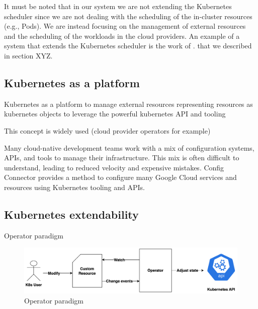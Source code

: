 It must be noted that in our system we are not extending the Kubernetes scheduler since we are not dealing with the scheduling of the in-cluster resources (e.g., Pods). 
We are instead focusing on the management of external resources and the scheduling of the workloads in the cloud providers.
An example of a system that extends the Kubernetes scheduler is the work of . \cite{} that we described in section XYZ.

\subsection{Kubernetes as a platform}

Kubernetes as a platform to manage external resources
representing resources as kubernetes objects to leverage the powerful kubernetes API and tooling

This concept is widely used 
(cloud provider operators for example)

Many cloud-native development teams work with a mix of configuration systems, APIs, and tools to manage their infrastructure. This mix is often difficult to understand, leading to reduced velocity and expensive mistakes. Config Connector provides a method to configure many Google Cloud services and resources using Kubernetes tooling and APIs.






\subsection{Kubernetes extendability}

Operator paradigm

\begin{figure}[H]
    \centering
    \includegraphics[width=1\linewidth]{images/opeartor_paradigm.png}
    \caption{Operator paradigm}
    \label{fig:operator_paradigm}
\end{figure}

